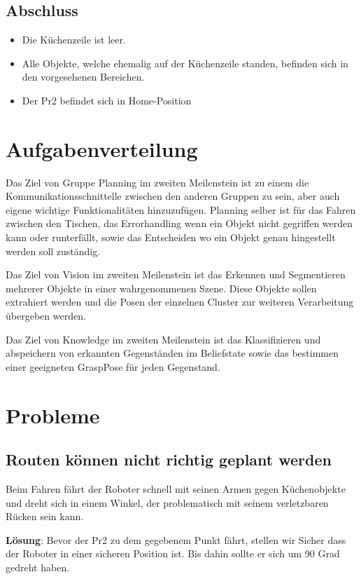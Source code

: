 \documentclass{suturo}
\begin{document}
\subsection{Abschluss}
\begin{itemize}
\item Die Küchenzeile ist leer.
\item Alle Objekte, welche ehemalig auf der Küchenzeile standen, befinden sich in den vorgesehenen Bereichen.
\item Der Pr2 befindet sich in Home-Position
\end{itemize}
\section{Aufgabenverteilung}
Das Ziel von Gruppe Planning im zweiten Meilenstein ist zu einem die Kommunikationsschnittelle zwischen den anderen Gruppen zu sein, aber auch eigene wichtige Funktionalitäten hinzuzufügen. Planning selber ist für das Fahren zwischen den Tischen, das Errorhandling wenn ein Objekt nicht gegriffen werden kann oder runterfällt, sowie das Entscheiden wo ein Objekt genau hingestellt werden soll zuständig.

Das Ziel von Vision im zweiten Meilenstein ist das Erkennen und Segmentieren mehrerer Objekte in einer wahrgenommenen Szene. Diese Objekte sollen extrahiert werden und die Posen der einzelnen Cluster zur weiteren Verarbeitung übergeben werden. 

Das Ziel von Knowledge im zweiten Meilenstein ist das Klassifizieren und abspeichern von erkannten Gegenständen im Beliefstate sowie das bestimmen einer geeigneten GraspPose für jeden Gegenstand.
\section{Probleme}
\subsection{Routen können nicht richtig geplant werden}
Beim Fahren fährt der Roboter schnell mit seinen Armen gegen Küchenobjekte und dreht sich in einem Winkel, der problematisch mit seinem verletzbaren Rücken sein kann.

\textbf{Lösung}: Bevor der Pr2 zu dem gegebenem Punkt fährt, stellen wir Sicher dass der Roboter in einer sicheren Position ist. Bis dahin sollte er sich um 90 Grad gedreht haben.
\end{document}
